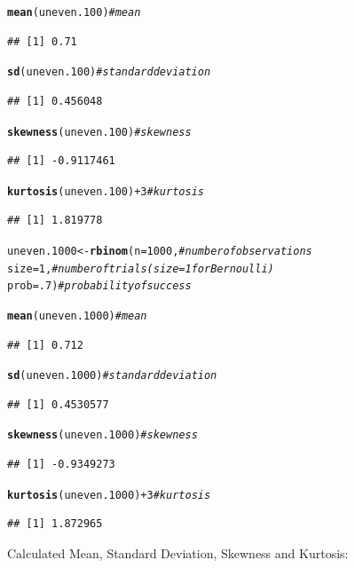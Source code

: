 \documentclass{article}\usepackage[]{graphicx}\usepackage[]{color}
\makeatletter
\newcommand{\hlnum}[1]{\textcolor[rgb]{0.686,0.059,0.569}{#1}}%
\newcommand{\hlcom}[1]{\textcolor[rgb]{0.678,0.584,0.686}{\textit{#1}}}%
\newcommand{\hlopt}[1]{\textcolor[rgb]{0,0,0}{#1}}%
\newcommand{\hlstd}[1]{\textcolor[rgb]{0.345,0.345,0.345}{#1}}%
\newcommand{\hlkwb}[1]{\textcolor[rgb]{0.69,0.353,0.396}{#1}}%
\newcommand{\hlkwc}[1]{\textcolor[rgb]{0.333,0.667,0.333}{#1}}%
\newcommand{\hlkwd}[1]{\textcolor[rgb]{0.737,0.353,0.396}{\textbf{#1}}}%
\newenvironment{kframe}{%
 \def\at@end@of@kframe{}%
 \ifinner\ifhmode%
  \def\at@end@of@kframe{\end{minipage}}%
  \begin{minipage}{\columnwidth}%
 \fi\fi%
 \def\FrameCommand##1{\hskip\@totalleftmargin \hskip-\fboxsep
 \colorbox{shadecolor}{##1}\hskip-\fboxsep
     \hskip-\linewidth \hskip-\@totalleftmargin \hskip\columnwidth}%
 \MakeFramed {\advance\hsize-\width
   \@totalleftmargin\z@ \linewidth\hsize
   \@setminipage}}%
 {\par\unskip\endMakeFramed%
 \at@end@of@kframe}
\newenvironment{knitrout}{}{} %
\makeatother
\begin{document}
\begin{enumerate}
\begin{enumerate}
\begin{knitrout}
\begin{kframe}
\begin{alltt}
\hlkwd{mean}\hlstd{(uneven.100)}                 \hlcom{#mean}
\end{alltt}
\begin{verbatim}
## [1] 0.71
\end{verbatim}
\begin{alltt}
\hlkwd{sd}\hlstd{(uneven.100)}                   \hlcom{#standard deviation}
\end{alltt}
\begin{verbatim}
## [1] 0.456048
\end{verbatim}
\begin{alltt}
\hlkwd{skewness}\hlstd{(uneven.100)}             \hlcom{#skewness}
\end{alltt}
\begin{verbatim}
## [1] -0.9117461
\end{verbatim}
\begin{alltt}
\hlkwd{kurtosis}\hlstd{(uneven.100)}\hlopt{+}\hlnum{3}           \hlcom{#kurtosis}
\end{alltt}
\begin{verbatim}
## [1] 1.819778
\end{verbatim}
\begin{alltt}
\hlstd{uneven.1000} \hlkwb{<-} \hlkwd{rbinom}\hlstd{(}\hlkwc{n}\hlstd{=}\hlnum{1000}\hlstd{,}    \hlcom{#number of observations}
                    \hlkwc{size}\hlstd{=}\hlnum{1}\hlstd{,}      \hlcom{#number of trials (size=1 for Bernoulli)}
                    \hlkwc{prob}\hlstd{=}\hlnum{.7}\hlstd{)}     \hlcom{#probability of success}

\hlkwd{mean}\hlstd{(uneven.1000)}                \hlcom{#mean}
\end{alltt}
\begin{verbatim}
## [1] 0.712
\end{verbatim}
\begin{alltt}
\hlkwd{sd}\hlstd{(uneven.1000)}                  \hlcom{#standard deviation}
\end{alltt}
\begin{verbatim}
## [1] 0.4530577
\end{verbatim}
\begin{alltt}
\hlkwd{skewness}\hlstd{(uneven.1000)}            \hlcom{#skewness}
\end{alltt}
\begin{verbatim}
## [1] -0.9349273
\end{verbatim}
\begin{alltt}
\hlkwd{kurtosis}\hlstd{(uneven.1000)}\hlopt{+}\hlnum{3}          \hlcom{#kurtosis}
\end{alltt}
\begin{verbatim}
## [1] 1.872965
\end{verbatim}
\end{kframe}
\end{knitrout}
Calculated Mean, Standard Deviation, Skewness and Kurtosis:


\end{enumerate}
\end{enumerate}
\end{document}

